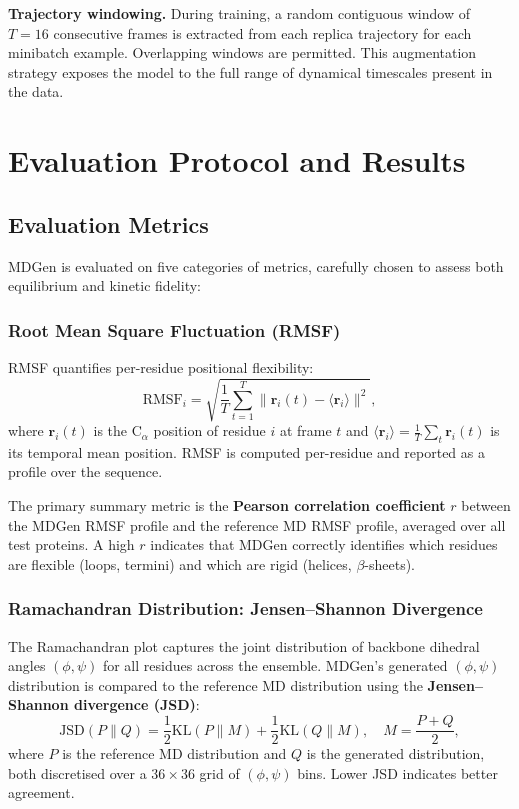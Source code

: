 \documentclass[11pt,a4paper]{article}
\newcommand{\br}{\mathbf{r}}
\begin{document}
\textbf{Trajectory windowing.}  During training, a random contiguous window of $T = 16$
consecutive frames is extracted from each replica trajectory for each minibatch example.  Overlapping
windows are permitted.  This augmentation strategy exposes the model to the full range of dynamical
timescales present in the data.


\section{Evaluation Protocol and Results}
\label{sec:results}

\subsection{Evaluation Metrics}

MDGen is evaluated on five categories of metrics, carefully chosen to assess both equilibrium and
kinetic fidelity:

\subsubsection{Root Mean Square Fluctuation (RMSF)}

RMSF quantifies per-residue positional flexibility:
\begin{equation}
  \text{RMSF}_i = \sqrt{\frac{1}{T}\sum_{t=1}^{T}\|\br_i(t) - \langle\br_i\rangle\|^2},
  \label{eq:rmsf}
\end{equation}
where $\br_i(t)$ is the $\text{C}_\alpha$ position of residue $i$ at frame $t$ and $\langle\br_i\rangle
= \frac{1}{T}\sum_t \br_i(t)$ is its temporal mean position.  RMSF is computed per-residue and
reported as a profile over the sequence.

The primary summary metric is the \textbf{Pearson correlation coefficient} $r$ between the MDGen
RMSF profile and the reference MD RMSF profile, averaged over all test proteins.  A high $r$
indicates that MDGen correctly identifies which residues are flexible (loops, termini) and which
are rigid (helices, $\beta$-sheets).

\subsubsection{Ramachandran Distribution: Jensen--Shannon Divergence}

The Ramachandran plot captures the joint distribution of backbone dihedral angles $(\phi, \psi)$
for all residues across the ensemble.  MDGen's generated $(\phi, \psi)$ distribution is compared
to the reference MD distribution using the \textbf{Jensen--Shannon divergence (JSD)}:
\begin{equation}
  \text{JSD}(P \| Q) = \frac{1}{2} \text{KL}(P \| M) + \frac{1}{2} \text{KL}(Q \| M),
  \quad M = \frac{P + Q}{2},
  \label{eq:jsd}
\end{equation}
where $P$ is the reference MD distribution and $Q$ is the generated distribution, both discretised
over a $36 \times 36$ grid of $(\phi, \psi)$ bins.  Lower JSD indicates better agreement.
\end{document}
